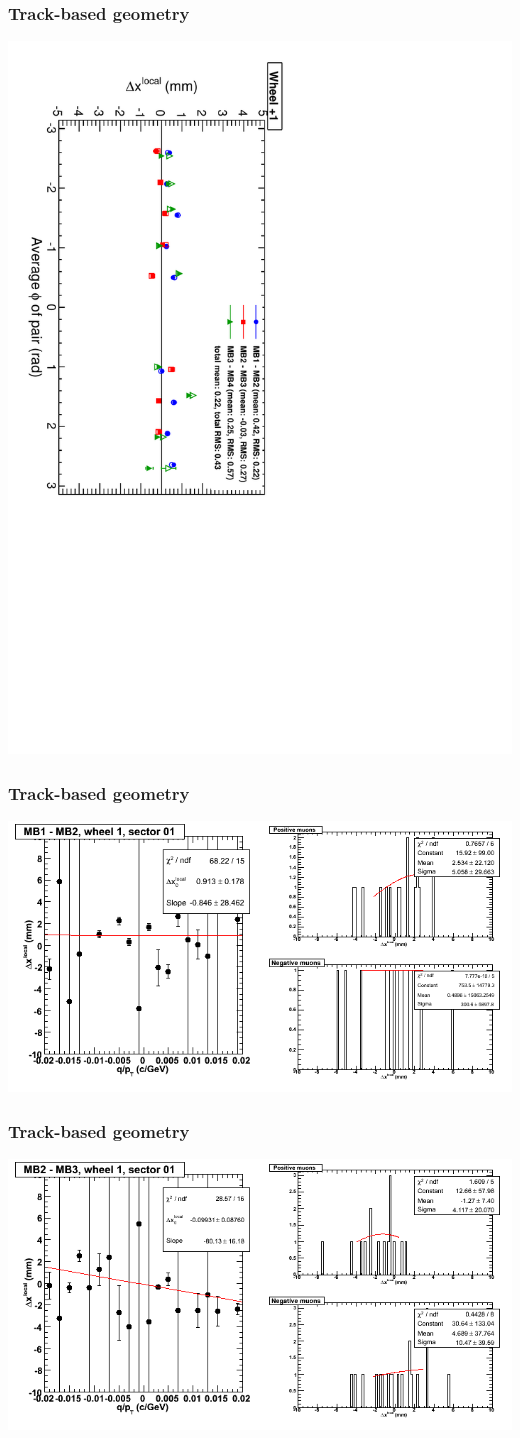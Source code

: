 \documentclass[compress]{beamer}
\begin{document}
\begin{frame}
\frametitle{Track-based geometry}
\includegraphics[height=\linewidth, angle=90]{NOV4_segdiff_x_whp1.pdf}
\end{frame}

\begin{frame}
\frametitle{Track-based geometry}
\includegraphics[width=\linewidth]{NOV4_segdiffs/dt13_resid_D_01_12.png}
\end{frame}

\begin{frame}
\frametitle{Track-based geometry}
\includegraphics[width=\linewidth]{NOV4_segdiffs/dt13_resid_D_01_23.png}
\end{frame}
\end{document}
